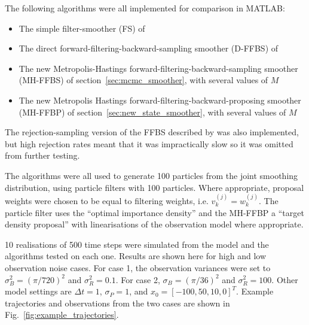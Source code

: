 \documentclass[10pt,twocolumn,twoside]{IEEEtran}
\begin{document}
The following algorithms were all implemented for comparison in MATLAB:

\begin{itemize}
	\item The simple filter-smoother (FS) of \cite{Kitagawa1996}
	\item The direct forward-filtering-backward-sampling smoother (D-FFBS) of \cite{Godsill2004}
	\item The new Metropolis-Hastings forward-filtering-backward-sampling smoother (MH-FFBS) of section~\ref{sec:mcmc_smoother}, with several values of $M$
	\item The new Metropolis Hastings forward-filtering-backward-proposing smoother (MH-FFBP) of section~\ref{sec:new_state_smoother}, with several values of $M$
\end{itemize}

The rejection-sampling version of the FFBS described by \cite{Douc2009} was also implemented, but high rejection rates meant that it was impractically slow so it was omitted from further testing.

The algorithms were all used to generate 100 particles from the joint smoothing distribution, using particle filters with 100 particles. Where appropriate, proposal weights were chosen to be equal to filtering weights, i.e. $v_k^{(j)} = w_k^{(j)}$. The particle filter uses the ``optimal importance density'' and the MH-FFBP a ``target density proposal'' with linearisations of the observation model where appropriate.

10 realisations of 500 time steps were simulated from the model and the algorithms tested on each one. Results are shown here for high and low observation noise cases. For case 1, the observation variances were set to $\sigma_B^2 = (\pi/720)^2$ and $\sigma_R^2 = 0.1$. For case 2, $\sigma_B = (\pi/36)^2$ and $\sigma_R^2 = 100$. Other model settings are $\Delta t = 1$, $\sigma_P = 1$, and $x_0 = [-100, 50, 10, 0]^T$. Example trajectories and observations from the two cases are shown in Fig.~\ref{fig:example_trajectories}.
\end{document}
